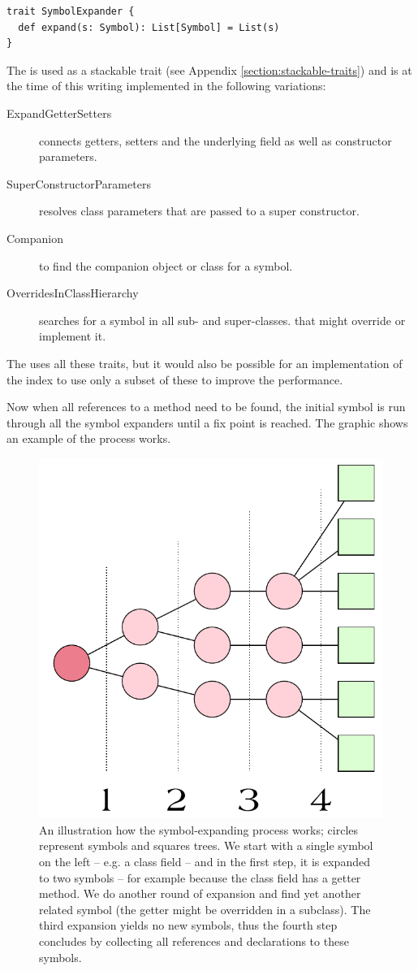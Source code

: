 \begin{lstlisting}
trait SymbolExpander {
  def expand(s: Symbol): List[Symbol] = List(s)
}
\end{lstlisting}

The  is used as a stackable trait (see Appendix \vref{section:stackable-traits}) and is at the time of this writing implemented in the following variations:

\begin{description}
 \item[ExpandGetterSetters] connects getters, setters and the underlying field as well as constructor parameters.
 \item[SuperConstructorParameters] resolves class parameters that are passed to a super constructor.
 \item[Companion] to find the companion object or class for a symbol.
 \item[OverridesInClassHierarchy] searches for a symbol in all sub- and super-classes. that might override or implement it.
\end{description}

The  uses all these traits, but it would also be possible for an implementation of the index to use only a subset of these to improve the performance. 

Now when all references to a method need to be found, the initial symbol is run through all the symbol expanders until a fix point is reached. The graphic  shows an example of the process works.

\begin{figure}
  \centering
  \includegraphics[width=0.5\linewidth]{expanding_symbols.pdf}
  \caption{An illustration how the symbol-expanding process works; circles represent symbols and squares trees. We start with a single symbol on the left -- e.g. a class field -- and in the first step, it is expanded to two symbols -- for example because the class field has a getter method. We do another round of expansion and find yet another related symbol (the getter might be overridden in a subclass). The third expansion yields no new symbols, thus the fourth step concludes by collecting all references and declarations to these symbols.}
  \label{figure:expanding-symbols}
\end{figure}


